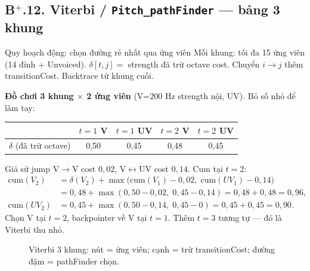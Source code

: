 \subsection*{B$^+$.12. Viterbi / \texttt{Pitch\_pathFinder} --- bảng 3 khung}

\begin{firstprin}{Quy hoạch động: chọn đường rẻ nhất qua ứng viên}
Mỗi khung: tối đa 15 ứng viên (14 đỉnh + Unvoiced). $\delta[t,j]=$ strength đã trừ octave cost. Chuyển $i\to j$ thêm transitionCost. Backtrace từ khung cuối.
\end{firstprin}

\noindent\textbf{Đồ chơi 3 khung $\times$ 2 ứng viên} (V=$200\text{ Hz}$ strength nội, UV). Bỏ số nhỏ để làm tay:
\begin{center}\small
\begin{tabular}{@{}lcccc@{}}
\toprule
 & $t=1$ V & $t=1$ UV & $t=2$ V & $t=2$ UV \\
\midrule
$\delta$ (đã trừ octave) & 0{,}50 & 0{,}45 & 0{,}48 & 0{,}45 \\
\bottomrule
\end{tabular}
\end{center}
Giả sử jump V$\to$V cost $0{,}02$, V$\leftrightarrow$UV cost $0{,}14$.
Cum tại $t=2$:
\begin{align*}
\mathrm{cum}(V_2)&=\delta(V_2)+\max\bigl(\mathrm{cum}(V_1)-0{,}02,\;\mathrm{cum}(UV_1)-0{,}14\bigr)\\
&=0{,}48+\max(0{,}50-0{,}02,\;0{,}45-0{,}14)=0{,}48+0{,}48=0{,}96,\\
\mathrm{cum}(UV_2)&=0{,}45+\max(0{,}50-0{,}14,\;0{,}45-0)=0{,}45+0{,}45=0{,}90.
\end{align*}
Chọn V tại $t=2$, backpointer về V tại $t=1$. Thêm $t=3$ tương tự --- đó là Viterbi thu nhỏ.

\begin{figure}[H]
\centering
{}
\caption{Viterbi 3 khung: nút = ứng viên; cạnh = trừ transitionCost; đường đậm = pathFinder chọn.}
\end{figure}

